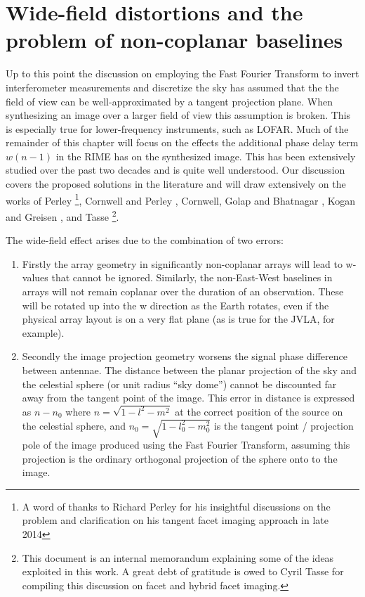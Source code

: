 \section{Wide-field distortions and the problem of non-coplanar baselines}
Up to this point the discussion on employing the Fast Fourier Transform to invert interferometer measurements and discretize the sky has assumed
that the the field of view can be well-approximated by a tangent projection plane. When synthesizing an image over a larger field of view
this assumption is broken. This is especially true for lower-frequency instruments, such as LOFAR. Much of the remainder of this 
chapter will focus on the effects the additional phase delay term $w(n-1)$ in the RIME has on the synthesized image. This has been extensively studied over 
the past two decades and is quite well understood. Our discussion covers the proposed solutions in the literature and will draw extensively on the works of 
Perley \cite[Lecture 19]{taylor1999synthesis}\footnote{A word of thanks to Richard Perley for his insightful discussions on the problem and clarification on his 
tangent facet imaging approach in late 2014}, Cornwell and Perley \cite{cornwell1992radio}, Cornwell, Golap and Bhatnagar \cite{cornwell2008noncoplanar}, Kogan and Greisen \cite{aipsfaceting}, and 
Tasse \cite{tassefaceting}\footnote{This document is an internal memorandum explaining some of the ideas exploited in this work. A great debt of gratitude 
is owed to Cyril Tasse for compiling this discussion on facet and hybrid facet imaging.}.

The wide-field effect arises due to the combination of two errors:
\begin{enumerate}
 \item Firstly the array geometry in significantly non-coplanar arrays will lead to w-values that cannot be ignored. Similarly, the non-East-West baselines
 in arrays will not remain coplanar over the duration of an observation. These will be rotated up into the w direction as the Earth rotates, even if the physical 
 array layout is on a very flat plane (as is true for the JVLA, for example).
 \item Secondly the image projection geometry worsens the signal phase difference between antennae. The distance between the planar projection of the sky and the 
 celestial sphere (or unit radius ``sky dome'') cannot be discounted far away from the tangent point of the image. This error in distance is expressed 
 as $n-n_0$ where $n = \sqrt{1-l^2-m^2}$ at the correct position of the source on the celestial sphere, and $n_0=\sqrt{1-l_0^2-m_0^2}$ is the 
 tangent point / projection pole of the image produced using the Fast Fourier Transform, assuming this projection is the ordinary orthogonal 
 projection of the sphere onto to the image.
\end{enumerate}

